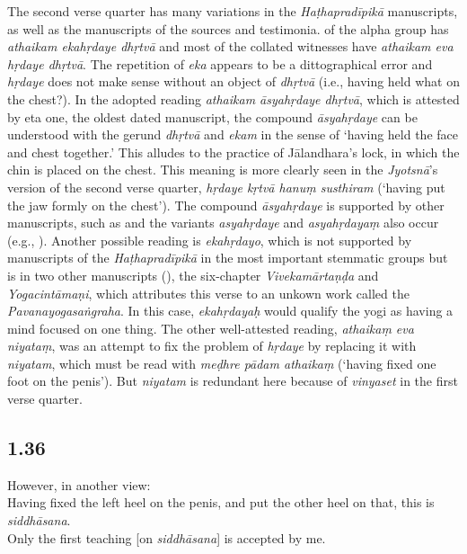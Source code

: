 \begin{ekdosis}
\begin{testimonia}[hp01_035]
\end{testimonia}

\begin{philcomm}[hp01_035]
The second verse quarter has many variations in the \emph{Haṭhapradīpikā} manuscripts, as well as the manuscripts of the sources and testimonia.  of the alpha group has \emph{athaikam ekahṛdaye dhṛtvā} and most of the collated witnesses have \emph{athaikam eva hṛdaye dhṛtvā}. The repetition of \emph{eka} appears to be a dittographical error and \emph{hṛdaye} does not make sense without an object of \emph{dhṛtvā} (i.e., having held what on the chest?). In the adopted reading \emph{athaikam āsyahṛdaye dhṛtvā}, which is attested by eta one, the oldest dated manuscript, the compound \emph{āsyahṛdaye} can be understood with the gerund \emph{dhṛtvā} and \emph{ekam} in the sense of `having held the face and chest together.' This alludes to the practice of Jālandhara's lock, in which the chin is placed on the chest. This meaning is more clearly seen in the \emph{Jyotsnā}'s version of the second verse quarter, \emph{hṛdaye kṛtvā hanuṃ susthiram} (`having put the jaw formly on the chest'). The compound \emph{āsyahṛdaye} is supported by other manuscripts, such as  and the variants \emph{asyahṛdaye} and \emph{asyahṛdayaṃ} also occur (e.g., ). Another possible reading is \emph{ekahṛdayo}, which is not supported by manuscripts of the \emph{Haṭhapradīpikā} in the most important stemmatic groups but is in two other manuscripts (), the six-chapter \emph{Vivekamārtaṇḍa} and \emph{Yogacintāmaṇi}, which attributes this verse to an unkown work called the \emph{Pavanayogasaṅgraha}. In this case, \emph{ekahṛdayaḥ} would qualify the yogi as having a mind focused on one thing. The other well-attested reading, \emph{athaikaṃ eva niyataṃ}, was an attempt to fix the problem of \emph{hṛdaye} by replacing it with \emph{niyatam}, which must be read with \emph{meḍhre pādam athaikaṃ} (`having fixed one foot on the penis'). But \emph{niyatam} is redundant here because of \emph{vinyaset} in the first verse quarter.     \end{philcomm}

\subsection*{1.36}
\begin{translation}[hp01_036]
However, in another view:\\
Having fixed the left heel on the penis, and put the other heel on that, this is \emph{siddhāsana}.\\ 
Only the first teaching [on \emph{siddhāsana}] is accepted by me.
\end{translation}


\end{ekdosis}
